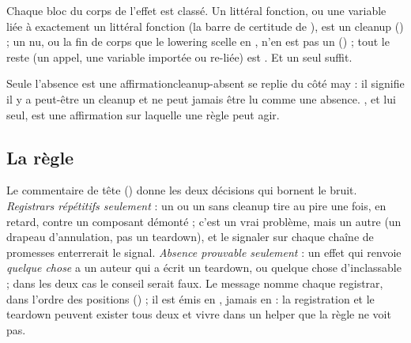 
Chaque bloc  du corps de l'effet est classé. Un littéral fonction, ou une variable liée à exactement un littéral fonction (la barre de certitude de ), est un cleanup () ; un  nu, ou la fin de corps que le lowering scelle en , n'en est pas un () ; tout le reste (un appel, une variable importée ou re-liée) est . Et un seul  suffit.

\begin{invariant}{Seule l'absence est une affirmation}{cleanup-absent}
 se replie du côté may : il signifie \og il y a peut-être un cleanup\fg{} et ne peut jamais être lu comme une absence. , et lui seul, est une affirmation sur laquelle une règle peut agir.
\end{invariant}

\subsection{La règle}


Le commentaire de tête () donne les deux décisions qui bornent le bruit. \emph{Registrars répétitifs seulement} : un  ou un  sans cleanup tire au pire une fois, en retard, contre un composant démonté ; c'est un vrai problème, mais un autre (un drapeau d'annulation, pas un teardown), et le signaler sur chaque chaîne de promesses enterrerait le signal. \emph{Absence prouvable seulement} : un effet qui renvoie \emph{quelque chose} a un auteur qui a écrit un teardown, ou quelque chose d'inclassable ; dans les deux cas le conseil serait faux. Le message nomme chaque registrar, dans l'ordre des positions () ; il est émis en \Warning{}, jamais en \Error{} : la registration et le teardown peuvent exister tous deux et vivre dans un helper que la règle ne voit pas.

